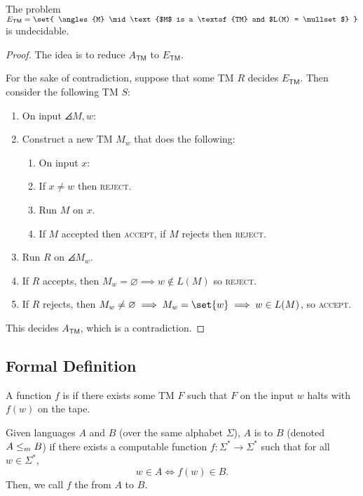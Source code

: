 \documentclass{standalone}
\begin{document}
\begin{proposition}
  The problem \(E_{\textsf{TM}} = \set{
    \angles{M} \mid \text{$M$ is a \textsf{TM} and $L(M) = \nullset$}
  }\) is undecidable.
\end{proposition}
\begin{proof}
  The idea is to reduce \(A_{\textsf{TM}}\) to \(E_{\textsf{TM}}\).

  For the sake of contradiction,
  suppose that some \textsf{TM} \(R\) decides \(E_{\textsf{TM}}\).
  Then consider the following \textsf{TM} \(S\):
  \begin{enumerate}[start=0]
    \item On input \(\angles{M, w}\):
    \item Construct a new \textsf{TM} \(M_w\) that does the following:
    \begin{enumerate}[(1), nosep, start=0]
      \item On input \(x\):
      \item If \(x \neq w\) then \textsc{reject}.
      \item Run \(M\) on \(x\).
      \item If \(M\) accepted then \textsc{accept},
      if \(M\) rejects then \textsc{reject}.
    \end{enumerate}
    \item Run \(R\) on \(\angles{M_w}\).
    \item If \(R\) accepts,
      then \(M_w = \varnothing \implies w \notin L(M)\) so \textsc{reject}.
    \item If \(R\) rejects,
      then \(M_w \neq \varnothing \implies M_w = \set{w} \implies w \in L(M)\),
      so \textsc{accept}.
  \end{enumerate}
  This decides \(A_{\textsf{TM}}\), which is a contradiction.
\end{proof}

\subsection{Formal Definition}
\begin{definition}
  A function \(f\) is  if there exists
  some \textsf{TM} \(F\) such that
  \(F\) on the input \(w\) halts with \(f(w)\) on the tape.
\end{definition}

\begin{definition}
  Given languages \(A\) and \(B\) (over the same alphabet \(\Sigma\)),
  \(A\) is  to \(B\) (denoted \(A \mathrel{\leq_m} B\))
  if there exists a computable function \(f\colon \Sigma^* \to \Sigma^*\)
  such that for all \(w \in \Sigma^*\),
  \[
    w \in A \iff f(w) \in B.
  \]
  Then, we call \(f\) the  from \(A\) to \(B\).
\end{definition}
\end{document}
